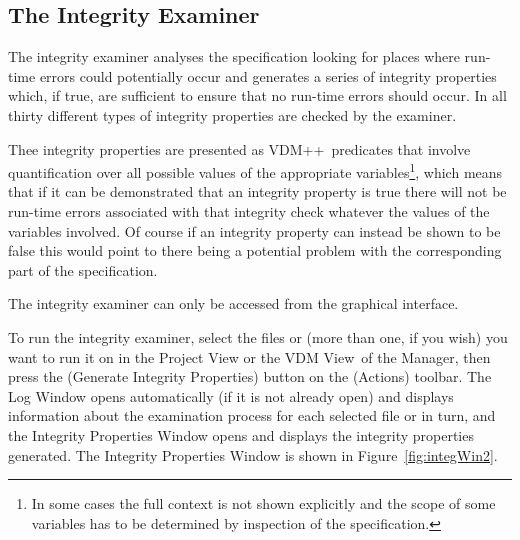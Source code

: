 \documentclass[\pformat,12pt]{article}
\newcommand{\vdmslpp}{VDM++}
\newcommand{\vdmModView}{\guicmd{VDM View}}
\newcommand{\guicmd}[1]{{\sf #1}}
\begin{document}



\newpage
\subsection{The Integrity Examiner}\label{sec:pog}

The integrity examiner analyses the specification looking for places
where run-time errors could potentially occur and generates a series
of integrity properties which, if true, are sufficient to ensure that
no run-time errors should occur. In all thirty different types of
integrity properties are checked by the examiner.

Thee integrity properties are presented as \vdmslpp\ predicates that 
involve quantification over all possible values of the appropriate
variables\footnote{In some cases the full context is not shown
  explicitly and the scope of some variables has to be determined by
  inspection of the specification.}, which means that if it can be
demonstrated that an integrity property is true there will not be
run-time errors associated with that integrity check whatever the
values of the variables involved. Of course if an integrity property
can instead be shown to be false this would point to there being a
potential problem with the corresponding part of the specification.

The integrity examiner can only be accessed from the graphical
interface. 

To run the integrity examiner, select the files or
 (more than one, if you
wish) you want to run it on in the \guicmd{Project View} or the
\vdmModView\ of the \guicmd{Manager}, then press the
(\guicmd{Generate Integrity Properties}) button on the (\guicmd{Actions})
toolbar. The \guicmd{Log Window} opens automatically (if it is not
already open) and displays information about the examination process
for each selected file or 
in turn, and the \guicmd{Integrity Properties Window} opens and
displays the integrity properties generated. The \guicmd{Integrity
  Properties Window} is shown in Figure~\ref{fig:integWin2}.
\end{document}
